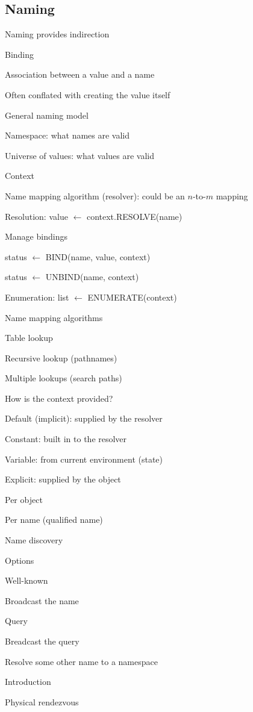 \subsection{Naming}
\enumstart
	\item Naming provides indirection
	\item Binding
	\enumstart
		\item Association between a value and a name
		\item Often conflated with creating the value itself
	\enumend
	\item General naming model
	\enumstart
		\item Namespace: what names are valid
		\item Universe of values: what values are valid
		\item Context
		\item Name mapping algorithm (resolver): could be an $n$-to-$m$ mapping 
	\enumend
	\item Resolution: value $\leftarrow$ context.RESOLVE(name)
	\item Manage bindings
	\enumstart
		\item status $\leftarrow$ BIND(name, value, context)
		\item status $\leftarrow$ UNBIND(name, context)
	\enumend
	\item Enumeration: list $\leftarrow$ ENUMERATE(context)
	\item Name mapping algorithms
	\enumstart
		\item Table lookup
		\item Recursive lookup (pathnames)
		\item Multiple lookups (search paths)
	\enumend
	\item How is the context provided?
	\enumstart
		\item Default (implicit): supplied by the resolver
		\enumstart
			\item Constant: built in to the resolver
			\item Variable: from current environment (state)
		\enumend
		\item Explicit: supplied by the object
		\enumstart
			\item Per object
			\item Per name (qualified name)
		\enumend
	\enumend
	\item Name discovery
	\enumstart
		\item Options
		\enumstart
			\item Well-known
			\item Broadcast the name
			\item Query
			\item Breadcast the query
			\item Resolve some other name to a namespace
			\item Introduction
			\item Physical rendezvous
		\enumend
	\enumend
\enumend

